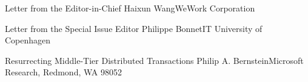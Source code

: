 \documentclass[11pt]{article}
\begin{document}


\begin{bulletin}


%
%

\begin{lettersection}


\begin{letter}{Letter from the Editor-in-Chief}
{Haixun Wang}{WeWork Corporation}

\end{letter}
%
\newpage
%
%
\begin{letter}{Letter from the Special Issue Editor}
{Philippe Bonnet}{IT University of Copenhagen}


\end{letter}

\end{lettersection}


\begin{opinionsection}
\begin{opinion}{Resurrecting Middle-Tier Distributed Transactions}
{Philip A. Bernstein}{Microsoft Research, Redmond, WA 98052}

\end{opinion}
\end{opinionsection}


\end{bulletin}
\end{document}
